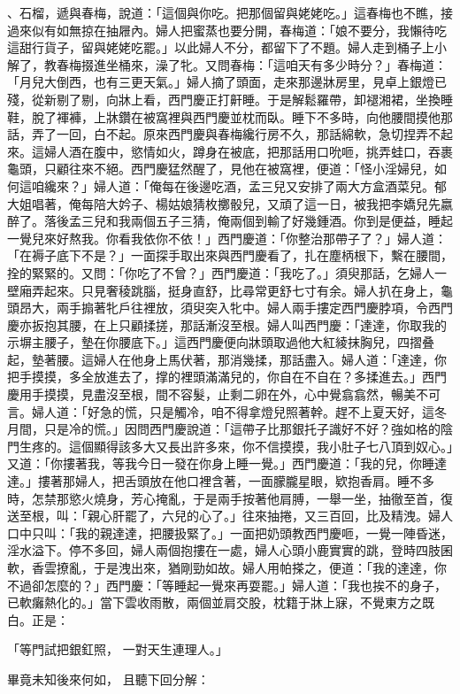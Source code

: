 、石榴，遞與春梅，說道：「這個與你吃。把那個留與姥姥吃。」這春梅也不瞧，接過來似有如無掠在抽屜內。婦人把蜜蒸也要分開，春梅道：「娘不要分，我懶待吃這甜行貨子，留與姥姥吃罷。」以此婦人不分，都留下了不題。婦人走到桶子上小解了，教春梅掇進坐桶來，澡了牝。又問春梅：「這咱天有多少時分？」春梅道：「月兒大倒西，也有三更天氣。」婦人摘了頭面，走來那邊牀房里，見卓上銀燈已殘，從新剔了剔，向牀上看，西門慶正打鼾睡。于是解鬆羅帶，卸褪湘裙，坐換睡鞋，脫了褌褲，上牀鑽在被窩裡與西門慶並枕而臥。睡下不多時，向他腰間摸他那話，弄了一回，白不起。原來西門慶與春梅纔行房不久，那話綿軟，急切捏弄不起來。這婦人酒在腹中，慾情如火，蹲身在被底，把那話用口吮咂，挑弄蛙口，吞裹龜頭，只顧往來不絕。西門慶猛然醒了，見他在被窩裡，便道：「怪小淫婦兒，如何這咱纔來？」婦人道：「俺每在後邊吃酒，孟三兒又安排了兩大方盒酒菜兒。郁大姐唱著，俺每陪大妗子、楊姑娘猜枚擲骰兒，又頑了這一日，被我把李嬌兒先嬴醉了。落後孟三兒和我兩個五子三猜，俺兩個到輸了好幾鍾酒。你到是便益，睡起一覺兒來好熬我。你看我依你不依！」西門慶道：「你整治那帶子了？」婦人道：「在褥子底下不是？」一面探手取出來與西門慶看了，扎在塵柄根下，繫在腰間，拴的緊緊的。又問：「你吃了不曾？」西門慶道：「我吃了。」須臾那話，乞婦人一壁廂弄起來。只見奢稜跳腦，挺身直舒，比尋常更舒七寸有余。婦人扒在身上，龜頭昂大，兩手搧著牝戶往裡放，須臾突入牝中。婦人兩手摟定西門慶脖項，令西門慶亦扳抱其腰，在上只顧揉搓，那話漸沒至根。婦人叫西門慶：「達達，你取我的示塀主腰子，墊在你腰底下。」這西門慶便向牀頭取過他大紅綾抹胸兒，四摺叠起，墊著腰。這婦人在他身上馬伏著，那消幾揉，那話盡入。婦人道：「達達，你把手摸摸，多全放進去了，撑的裡頭滿滿兒的，你自在不自在？多揉進去。」西門慶用手摸摸，見盡沒至根，間不容髮，止剩二卵在外，心中覺翕翕然，暢美不可言。婦人道：「好急的慌，只是觸冷，咱不得拿燈兒照著幹。趕不上夏天好，這冬月間，只是冷的慌。」因問西門慶說道：「這帶子比那銀托子識好不好？強如格的陰門生疼的。這個顯得該多大又長出許多來，你不信摸摸，我小肚子七八頂到奴心。」又道：「你摟著我，等我今日一發在你身上睡一覺。」西門慶道：「我的兒，你睡達達。」摟著那婦人，把舌頭放在他口裡含著，一面朦朧星眼，欵抱香肩。睡不多時，怎禁那慾火燒身，芳心掩亂，于是兩手按著他肩膊，一舉一坐，抽徹至首，復送至根，叫：「親心肝罷了，六兒的心了。」往來抽捲，又三百回，比及精洩。婦人口中只叫：「我的親達達，把腰扱緊了。」一面把奶頭教西門慶咂，一覺一陣昏迷，淫水溢下。停不多回，婦人兩個抱摟在一處，婦人心頭小鹿實實的跳，登時四肢囷軟，香雲撩亂，于是洩出來，猶剛勁如故。婦人用帕搽之，便道：「我的達達，你不過卻怎麼的？」西門慶：「等睡起一覺來再耍罷。」婦人道：「我也挨不的身子，已軟癱熱化的。」當下雲收雨散，兩個並肩交股，枕籍于牀上寐，不覺東方之既白。正是：

「等門試把銀釭照，  一對天生連理人。」

畢竟未知後來何如，  且聽下回分解：


